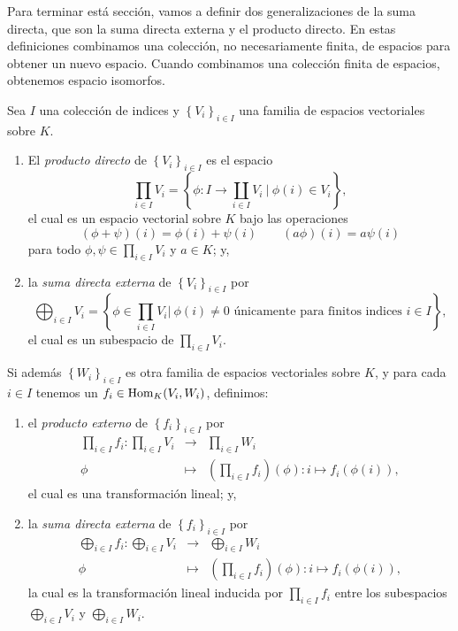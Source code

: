 \begin{obs}
Para terminar est\'a secci\'on, vamos a definir dos generalizaciones de la suma directa, que son la suma directa externa y el producto directo. En estas definiciones combinamos una colecci\'on, no necesariamente finita, de espacios para obtener un nuevo espacio. Cuando combinamos una colecci\'on finita de espacios, obtenemos espacio isomorfos.
\end{obs}

\begin{defn}
Sea $I$ una colecci\'on de indices y $\left\{V_i\right\}_{i\in I}$ una familia de espacios vectoriales sobre $K$.
\begin{enumerate}
\item El \emph{producto directo} de $\left\{V_i\right\}_{i\in I}$ es el espacio
\[
\prod_{i\in I} V_i=\left\{\phi: I\rightarrow \coprod_{i\in I}V_i\ \Big|\ \phi(i)\in V_i\right\},
\]
el cual es un espacio vectorial sobre $K$ bajo las operaciones
\[
(\phi+\psi)(i)=\phi(i)+\psi(i)\qquad (a\phi)(i)=a\psi(i)
\]
para todo $\phi,\psi\in \prod_{i\in I} V_i$ y $a\in K$; y,
\item la \emph{suma directa externa} de $\left\{V_i\right\}_{i\in I}$ por
\[
\bigoplus_{i\in I} V_i=\left\{\phi\in \prod_{i\in I} V_i \Big|\ \phi(i)\ne 0\textrm{ \'unicamente para finitos indices } i\in I\right\},
\]
el cual es un subespacio de $\prod_{i\in I} V_i$.
\end{enumerate} 
Si adem\'as $\left\{W_i\right\}_{i\in I}$ es otra familia de espacios vectoriales sobre $K$, y para cada $i\in I$ tenemos un $f_i\in\operatorname{Hom}_K(V_i,W_i)$, definimos:
\begin{enumerate}
\item el \emph{producto externo} de $\left\{f_i\right\}_{i\in I}$ por
\begin{eqnarray*}
\prod_{i\in I} f_i: \prod_{i\in I} V_i & \longrightarrow & \prod_{i\in I} W_i\\
                           \phi & \longmapsto & \left(\prod_{i\in I} f_i\right) (\phi): i\mapsto f_i\left(\phi(i)\right),
\end{eqnarray*}
el cual es una transformaci\'on lineal; y,
\item la \emph{suma directa externa} de $\left\{f_i\right\}_{i\in I}$ por
\begin{eqnarray*}
\bigoplus_{i\in I} f_i: \bigoplus_{i\in I} V_i & \longrightarrow & \bigoplus_{i\in I} W_i\\
                           \phi & \longmapsto & \left(\prod_{i\in I} f_i\right) (\phi): i\mapsto f_i\left(\phi(i)\right),
\end{eqnarray*}
la cual es la transformaci\'on lineal inducida por  $\prod_{i\in I} f_i$ entre los subespacios $\bigoplus_{i\in I} V_i$ y $\bigoplus_{i\in I} W_i$.
\end{enumerate}
\end{defn}

